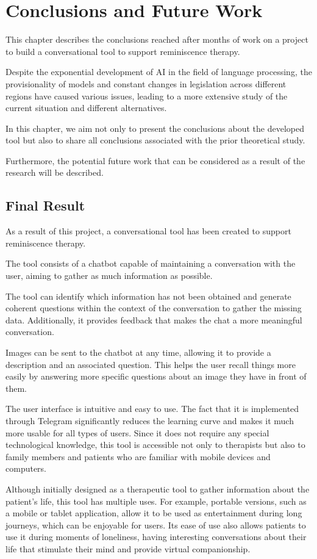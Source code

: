 \chapter*{Conclusions and Future Work}
\label{chap:conclusions}
This chapter describes the conclusions reached after months of work on a project to build a conversational tool to support reminiscence therapy.

Despite the exponential development of AI in the field of language processing, the provisionality of models and constant changes in legislation across different regions have caused various issues, leading to a more extensive study of the current situation and different alternatives.

In this chapter, we aim not only to present the conclusions about the developed tool but also to share all conclusions associated with the prior theoretical study.

Furthermore, the potential future work that can be considered as a result of the research will be described.

\section{Final Result}
As a result of this project, a conversational tool has been created to support reminiscence therapy.

The tool consists of a chatbot capable of maintaining a conversation with the user, aiming to gather as much information as possible.

The tool can identify which information has not been obtained and generate coherent questions within the context of the conversation to gather the missing data. Additionally, it provides feedback that makes the chat a more meaningful conversation.

Images can be sent to the chatbot at any time, allowing it to provide a description and an associated question. This helps the user recall things more easily by answering more specific questions about an image they have in front of them.

The user interface is intuitive and easy to use. The fact that it is implemented through Telegram significantly reduces the learning curve and makes it much more usable for all types of users. Since it does not require any special technological knowledge, this tool is accessible not only to therapists but also to family members and patients who are familiar with mobile devices and computers.

Although initially designed as a therapeutic tool to gather information about the patient's life, this tool has multiple uses. For example, portable versions, such as a mobile or tablet application, allow it to be used as entertainment during long journeys, which can be enjoyable for users. Its ease of use also allows patients to use it during moments of loneliness, having interesting conversations about their life that stimulate their mind and provide virtual companionship.

